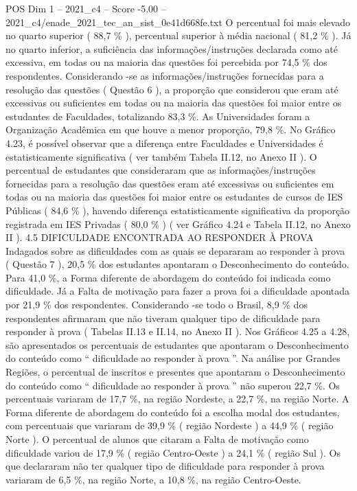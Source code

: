 \begin{textsample}{POS Dim 1 – 2021\_c4 – Score -5.00 – 2021\_c4/enade\_2021\_tec\_an\_sist\_0e41d668fe.txt}
O percentual foi mais elevado no quarto superior ( 88,7 \% ), percentual superior à média nacional ( 81,2 \% ).
Já no quarto inferior, a suficiência das informações/instruções declarada como até excessiva, em todas ou na maioria das questões foi percebida por 74,5 \% dos respondentes.
Considerando -se as informações/instruções fornecidas para a resolução das questões ( Questão 6 ), a proporção que considerou que eram até excessivas ou suficientes em todas ou na maioria das questões foi maior entre os estudantes de Faculdades, totalizando 83,3 \%.
As Universidades foram a Organização Acadêmica em que houve a menor proporção, 79,8 \%.
No Gráfico 4.23, é possível observar que a diferença entre Faculdades e Universidades é estatisticamente significativa ( ver também Tabela II.12, no Anexo II ).
O percentual de estudantes que consideraram que as informações/instruções fornecidas para a resolução das questões eram até excessivas ou suficientes em todas ou na maioria das questões foi maior entre os estudantes de cursos de IES Públicas ( 84,6 \% ), havendo diferença estatisticamente significativa da proporção registrada em IES Privadas ( 80,0 \% ) ( ver Gráfico 4.24 e Tabela II.12, no Anexo II ). 4.5 DIFICULDADE ENCONTRADA AO RESPONDER À PROVA Indagados sobre as dificuldades com as quais se depararam ao responder à prova ( Questão 7 ), 20,5 \% dos estudantes apontaram o Desconhecimento do conteúdo.
Para 41,0 \%, a Forma diferente de abordagem do conteúdo foi indicada como dificuldade.
Já a Falta de motivação para fazer a prova foi a dificuldade apontada por 21,9 \% dos respondentes.
Considerando -se todo o Brasil, 8,9 \% dos respondentes afirmaram que não tiveram qualquer tipo de dificuldade para responder à prova ( Tabelas II.13 e II.14, no Anexo II ).
Nos Gráficos 4.25 a 4.28, são apresentados os percentuais de estudantes que apontaram o Desconhecimento do conteúdo como “ dificuldade ao responder à prova ”.
Na análise por Grandes Regiões, o percentual de inscritos e presentes que apontaram o Desconhecimento do conteúdo como “ dificuldade ao responder à prova ” não superou 22,7 \%.
Os percentuais variaram de 17,7 \%, na região Nordeste, a 22,7 \%, na região Norte.
A Forma diferente de abordagem do conteúdo foi a escolha modal dos estudantes, com percentuais que variaram de 39,9 \% ( região Nordeste ) a 44,9 \% ( região Norte ).
O percentual de alunos que citaram a Falta de motivação como dificuldade variou de 17,9 \% ( região Centro-Oeste ) a 24,1 \% ( região Sul ).
Os que declararam não ter qualquer tipo de dificuldade para responder à prova variaram de 6,5 \%, na região Norte, a 10,8 \%, na região Centro-Oeste.

\end{textsample}
